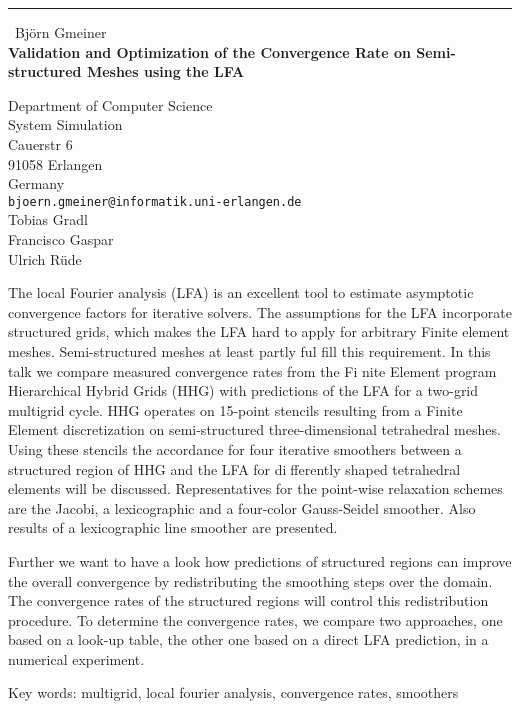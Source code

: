 \documentclass{report}
\begin{document}
\begin{center}
\rule{6in}{1pt} \
{\large Bj\"orn Gmeiner \\
{\bf Validation and Optimization of the Convergence Rate on Semi-structured Meshes using the LFA}}

Department of Computer Science \\ System Simulation \\ Cauerstr 6 \\ 91058 Erlangen \\ Germany
\\
{\tt bjoern.gmeiner@informatik.uni-erlangen.de}\\
Tobias Gradl\\
Francisco Gaspar\\
Ulrich R\"ude\end{center}

The local Fourier analysis (LFA) is an excellent tool to estimate
asymptotic convergence factors for iterative solvers. The assumptions for
the LFA incorporate structured grids, which makes the LFA hard to apply
for arbitrary Finite element meshes. Semi-structured meshes at least
partly ful fill this requirement. In this talk we compare measured
convergence rates from the Fi nite Element program Hierarchical Hybrid
Grids (HHG) with predictions of the LFA for a two-grid multigrid cycle.
HHG operates on 15-point stencils resulting from a Finite Element
discretization on semi-structured three-dimensional tetrahedral meshes.
Using these stencils the accordance for four iterative smoothers between
a structured region of HHG and the LFA for differently shaped
tetrahedral elements will be discussed. Representatives for the
point-wise relaxation schemes are the Jacobi, a lexicographic and a
four-color Gauss-Seidel smoother. Also results of a lexicographic line
smoother are presented.

Further we want to have a look how predictions of structured regions can
improve the overall convergence by redistributing the smoothing steps
over the domain. The convergence rates of the structured regions will
control this redistribution procedure. To determine the convergence
rates, we compare two approaches, one based on a look-up table, the other
one based on a direct LFA prediction, in a numerical experiment.

Key words: multigrid, local fourier analysis, convergence rates, smoothers
\end{document}
